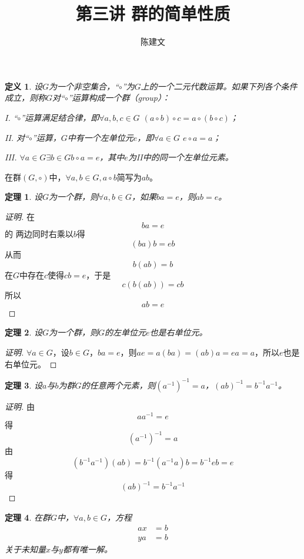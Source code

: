 \documentclass{article}
\newtheorem{Def}{定义}
\newtheorem{Thm}{定理}
\begin{document}
\begin{CJK*}{UTF8}{gbsn}
  \title{第三讲 群的简单性质}
  \author{陈建文}
  \maketitle
  

  \begin{Def}
    设$G$为一个非空集合，“$\circ$”为$G$上的一个二元代数运算。如果下列各个条件成立，则称$G$对“$\circ$”运算构成一个群（group）：
  
    I. “$\circ$”运算满足结合律，即$\forall a,b,c \in G$ $(a\circ b)\circ c = a\circ(b\circ c)$；
  
    II. 对“$\circ$”运算，$G$中有一个左单位元$e$，即$\forall a\in G$ $e\circ a = a$；
  
    III. $\forall a\in G \exists b\in G b\circ a = e$，其中$e$为II中的同一个左单位元素。
  \end{Def}
  在群$(G,\circ)$中，$\forall a,b\in G, a\circ b$简写为$ab$。
  \begin{Thm}
    设$G$为一个群，则$\forall a,b\in G$，如果$ba=e$，则$ab=e$。
  \end{Thm}
  \begin{proof}[证明]
    在\[ba=e\]的
    两边同时右乘以$b$得
    \[(ba)b=eb\]
    从而
    \[b(ab)=b\]
    在$G$中存在$c$使得$cb=e$，于是
    \[c(b(ab))=cb\]
    所以
    \[ab=e\]
  \end{proof}
  \begin{Thm}
    设$G$为一个群，则$G$的左单位元$e$也是右单位元。
  \end{Thm}
  \begin{proof}[证明]
    $\forall a\in G$，设$b\in G$，$ba=e$，则$ae=a(ba)=(ab)a=ea=a$，所以$e$也是右单位元。
  \end{proof}
  \begin{Thm}
    设$a$与$b$为群$G$的任意两个元素，则$(a^{-1})^{-1}=a$，$(ab)^{-1}=b^{-1}a^{-1}$。
  \end{Thm}
  \begin{proof}[证明]
    由\[aa^{-1}=e\]
    得\[(a^{-1})^{-1}=a\]
  由\[(b^{-1}a^{-1})(ab)=b^{-1}(a^{-1}a)b=b^{-1}eb=e\]
  得\[(ab)^{-1}=b^{-1}a^{-1}\]
  \end{proof}
  \begin{Thm}
   在群$G$中，$\forall a, b \in G$，方程
   \begin{align*}
    ax&=b\\
    ya&=b
   \end{align*}
   关于未知量$x$与$y$都有唯一解。 
  \end{Thm}
  

\end{CJK*}
\end{document}
